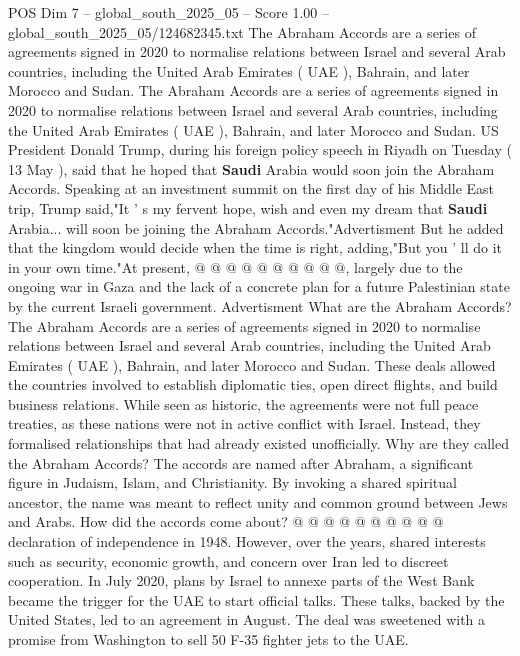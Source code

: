 \begin{textsample}{POS Dim 7 – global\_south\_2025\_05 – Score 1.00 – global\_south\_2025\_05/124682345.txt}  \label{ex:f7_pos_237}
The Abraham Accords are a series of agreements signed in 2020 to normalise relations between Israel and several Arab countries, including the United Arab Emirates ( UAE ), Bahrain, and later Morocco and Sudan.
The Abraham Accords are a series of agreements signed in 2020 to normalise relations between Israel and several Arab countries, including the United Arab Emirates ( UAE ), Bahrain, and later Morocco and Sudan.
US President Donald Trump, during his foreign policy speech in Riyadh on Tuesday ( 13 May ), said that he hoped that \textbf{Saudi} Arabia would soon join the Abraham Accords.
Speaking at an investment summit on the first day of his Middle East trip, Trump said,"It ' s my fervent hope, wish and even my dream that \textbf{Saudi} Arabia... will soon be joining the Abraham Accords."Advertisment But he added that the kingdom would decide when the time is right, adding,"But you ' ll do it in your own time."At present, @ @ @ @ @ @ @ @ @ @, largely due to the ongoing war in Gaza and the lack of a concrete plan for a future Palestinian state by the current Israeli government.
Advertisment What are the Abraham Accords?
The Abraham Accords are a series of agreements signed in 2020 to normalise relations between Israel and several Arab countries, including the United Arab Emirates ( UAE ), Bahrain, and later Morocco and Sudan.
These deals allowed the countries involved to establish diplomatic ties, open direct flights, and build business relations.
While seen as historic, the agreements were not full peace treaties, as these nations were not in active conflict with Israel.
Instead, they formalised relationships that had already existed unofficially.
Why are they called the Abraham Accords?
The accords are named after Abraham, a significant figure in Judaism, Islam, and Christianity.
By invoking a shared spiritual ancestor, the name was meant to reflect unity and common ground between Jews and Arabs.
How did the accords come about? @ @ @ @ @ @ @ @ @ @ declaration of independence in 1948.
However, over the years, shared interests such as security, economic growth, and concern over Iran led to discreet cooperation.
In July 2020, plans by Israel to annexe parts of the West Bank became the trigger for the UAE to start official talks.
These talks, backed by the United States, led to an agreement in August.
The deal was sweetened with a promise from Washington to sell 50 F-35 fighter jets to the UAE.

\end{textsample}

